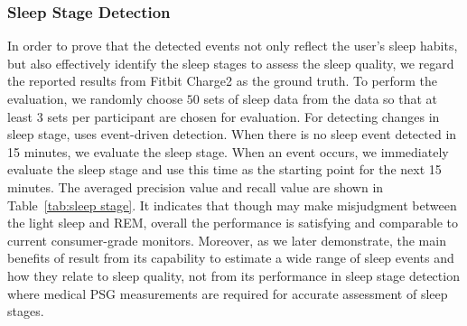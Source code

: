 \subsubsection{Sleep Stage Detection}

In order to prove that the detected events not only reflect the user's sleep habits, but also effectively identify the sleep stages to assess the sleep quality, we regard the reported results from Fitbit Charge2 as the ground truth. To perform the evaluation, we randomly choose $50$ sets of sleep data from the data so that at least $3$ sets per participant are chosen for evaluation. For detecting changes in sleep stage, {\systemname} uses event-driven detection. When there is no sleep event detected in 15 minutes, we evaluate the sleep stage. When an event occurs, we immediately evaluate the sleep stage and use this time as the starting point for the next 15 minutes. The averaged precision value and recall value are shown in Table~\ref{tab:sleep stage}. It indicates that though {\systemname} may make misjudgment between the light sleep and REM, overall the performance is satisfying and comparable to current consumer-grade monitors. Moreover, as we later demonstrate, the main benefits of {\systemname} result from its capability to estimate a wide range of sleep events and how they relate to sleep quality, not from its performance in sleep stage detection where medical PSG measurements are required for accurate assessment of sleep stages.

